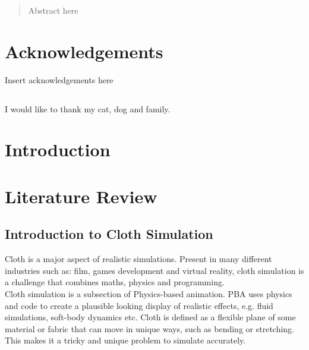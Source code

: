 \documentclass[12pt,a4paper]{article}
\begin{document}


\pagebreak

\pagebreak

\begin{abstract}
Abstract here
\end{abstract}
\pagebreak

\tableofcontents %
\newpage

\listoftables
\newpage

\listoffigures
\newpage

\section*{Acknowledgements}
Insert acknowledgements here
\subsection*{}
	I would like to thank my cat, dog and family.
\newpage

\section{Introduction}
\newpage
\section{Literature Review}
\subsection{Introduction to Cloth Simulation}
Cloth is a major aspect of realistic simulations. Present in many different industries such as: film, games development and virtual reality, cloth simulation is a challenge that combines maths, physics and programming. \\

Cloth simulation is a subsection of Physics-based animation. PBA uses physics and code to create a plausible looking display of realistic effects, e.g. fluid simulations, soft-body dynamics etc. Cloth is defined as a flexible plane of some material or fabric that can move in unique ways, such as bending or stretching. This makes it a tricky and unique problem to simulate accurately. \\
\end{document}
